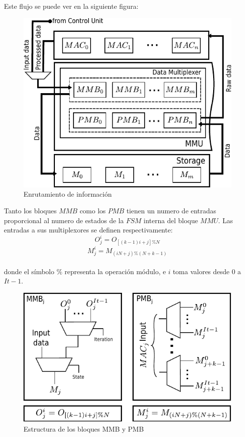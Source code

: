 Este flujo se puede ver en la siguiente figura:
\begin{figure}
\centering
\includegraphics[scale=0.9]{muxes}
\caption{ Enrutamiento de información}
\label{mmu_routing}
\end{figure}
Tanto los bloques $MMB$ como los $PMB$ tienen un numero de entradas proporcional al numero de estados de la $FSM$ interna del bloque $MMU$. 
Las entradas a sus multiplexores se definen respectivamente:
\begin{equation}%
  O_j^i = O_{[(k-1)i+j]\%N}
\end{equation}
\begin{equation}%
  M_j^i = M_{(iN+j)\%(N+k-1)}
\end{equation}
\\
donde el símbolo $ \% $ representa la operación módulo, e $i$ toma valores desde $0$ a $It-1$.

\bigskip
\bigskip
\begin{figure}
\centering
\includegraphics{muxes_cont}
\caption{ Estructura de los bloques MMB y PMB}
\label{mmu_structure}
\end{figure}